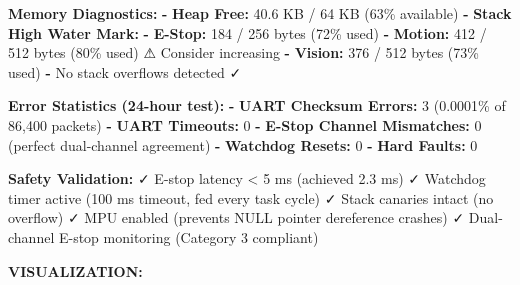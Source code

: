 \documentclass[
]{article}
\newenvironment{Shaded}{\begin{snugshade}}{\end{snugshade}}
\newcommand{\AttributeTok}[1]{\textcolor[rgb]{0.13,0.29,0.53}{#1}}
\newcommand{\DecValTok}[1]{\textcolor[rgb]{0.00,0.00,0.81}{#1}}
\newcommand{\FunctionTok}[1]{\textcolor[rgb]{0.13,0.29,0.53}{\textbf{#1}}}
\newcommand{\KeywordTok}[1]{\textcolor[rgb]{0.13,0.29,0.53}{\textbf{#1}}}
\begin{document}
\begin{Shaded}
\begin{Highlighting}[]
\FunctionTok{Memory Diagnostics}\KeywordTok{:}
\AttributeTok{  }\KeywordTok{{-}}\AttributeTok{ }\FunctionTok{Heap Free}\KeywordTok{:}\AttributeTok{ 40.6 KB / 64 KB (63\% available)}
\AttributeTok{  }\KeywordTok{{-}}\AttributeTok{ }\FunctionTok{Stack High Water Mark}\KeywordTok{:}
\AttributeTok{      }\KeywordTok{{-}}\AttributeTok{ }\FunctionTok{E{-}Stop}\KeywordTok{:}\AttributeTok{ 184 / 256 bytes (72\% used)}
\AttributeTok{      }\KeywordTok{{-}}\AttributeTok{ }\FunctionTok{Motion}\KeywordTok{:}\AttributeTok{ 412 / 512 bytes (80\% used) ⚠ Consider increasing}
\AttributeTok{      }\KeywordTok{{-}}\AttributeTok{ }\FunctionTok{Vision}\KeywordTok{:}\AttributeTok{ 376 / 512 bytes (73\% used)}
\AttributeTok{  }\KeywordTok{{-}}\AttributeTok{ No stack overflows detected ✓}

\FunctionTok{Error Statistics (24{-}hour test)}\KeywordTok{:}
\AttributeTok{  }\KeywordTok{{-}}\AttributeTok{ }\FunctionTok{UART Checksum Errors}\KeywordTok{:}\AttributeTok{ 3 (0.0001\% of 86,400 packets)}
\AttributeTok{  }\KeywordTok{{-}}\AttributeTok{ }\FunctionTok{UART Timeouts}\KeywordTok{:}\AttributeTok{ }\DecValTok{0}
\AttributeTok{  }\KeywordTok{{-}}\AttributeTok{ }\FunctionTok{E{-}Stop Channel Mismatches}\KeywordTok{:}\AttributeTok{ 0 (perfect dual{-}channel agreement)}
\AttributeTok{  }\KeywordTok{{-}}\AttributeTok{ }\FunctionTok{Watchdog Resets}\KeywordTok{:}\AttributeTok{ }\DecValTok{0}
\AttributeTok{  }\KeywordTok{{-}}\AttributeTok{ }\FunctionTok{Hard Faults}\KeywordTok{:}\AttributeTok{ }\DecValTok{0}

\FunctionTok{Safety Validation}\KeywordTok{:}
\AttributeTok{  ✓ E{-}stop latency \textless{} 5 ms (achieved 2.3 ms)}
\AttributeTok{  ✓ Watchdog timer active (100 ms timeout, fed every task cycle)}
\AttributeTok{  ✓ Stack canaries intact (no overflow)}
\AttributeTok{  ✓ MPU enabled (prevents NULL pointer dereference crashes)}
\AttributeTok{  ✓ Dual{-}channel E{-}stop monitoring (Category 3 compliant)}
\end{Highlighting}
\end{Shaded}

\textbf{VISUALIZATION:}
\end{document}
